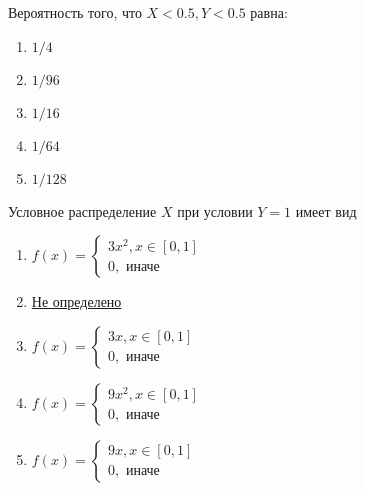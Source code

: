 \documentclass[t]{beamer}
\begin{document}
 \begin{frame} \label{33} 
\begin{block}{33} 

 Вероятность того, что $X<0.5, Y<0.5$ равна:
  


 \end{block} 
\begin{enumerate} 
\item[] \hyperlink{33-No}{\beamergotobutton{} $1/4$}
\item[] \hyperlink{33-No}{\beamergotobutton{} $1/96$}
\item[] \hyperlink{33-No}{\beamergotobutton{} $1/16$}
\item[] \hyperlink{33-Yes}{\beamergotobutton{} $1/64$}
\item[] \hyperlink{33-No}{\beamergotobutton{} $1/128$}
\end{enumerate} 
\end{frame} 


 \begin{frame} \label{34} 
\begin{block}{34} 

  Условное распределение $X$ при условии $Y=1$ имеет вид
  


 \end{block} 
\begin{enumerate} 
\item[] \hyperlink{34-Yes}{\beamergotobutton{} $ f(x) = \begin{cases}
	3 x^2 , x \in [0,1] \\
	0,\text{ иначе}
	\end{cases} $}
\item[] \hyperlink{34-No}{\beamergotobutton{} Не определено}
\item[] \hyperlink{34-No}{\beamergotobutton{} $ f(x) = \begin{cases}
	3 x , x \in [0,1] \\
	0,\text{ иначе}
	\end{cases}  $}
\item[] \hyperlink{34-No}{\beamergotobutton{} $ f(x) = \begin{cases}
	9 x^2 , x \in [0,1] \\
	0,\text{ иначе}
	\end{cases}  $}
\item[] \hyperlink{34-No}{\beamergotobutton{} $ f(x) = \begin{cases}
	9 x , x \in [0,1] \\
	0,\text{ иначе}
	\end{cases}  $}
\end{enumerate} 
\end{frame} 
\end{document}
